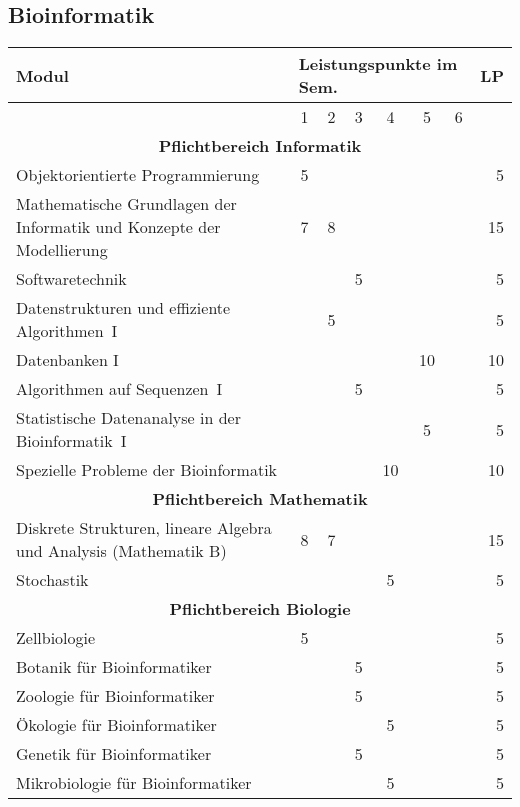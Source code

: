 \subsection{Bioinformatik}
\label{studiengang_bioinformatik}

\begin{table}[tbp]
\begin{small}
\begin{tabularx}{\textwidth}{|X||c|c|c|c|c|c||r|}
    \hline
    \textbf{Modul}&\multicolumn{6}{l||}{\textbf{Leistungspunkte im Sem.}}&\textbf{LP}\\\hline
    &1&2&3&4&5&6&\\\hline\hline
    \multicolumn{8}{|c|}{\textbf{Pflichtbereich Informatik}}\\\hline
    Objektorientierte Programmierung&5&&&&&&5\\\hline
    Mathematische Grundlagen der Informatik und Konzepte der Modellierung&7&8&&&&&15\\\hline
    Softwaretechnik&&&5&&&&5\\\hline
    Datenstrukturen und effiziente Algorithmen~I&&5&&&&&5\\\hline
    Datenbanken I&&&&&10&&10\\\hline
    Algorithmen auf Sequenzen~I&&&5&&&&5\\\hline
    Statistische Datenanalyse in der Bioinformatik~I&&&&&5&&5\\\hline
    Spezielle Probleme der Bioinformatik &&&&10&&&10\\\hline\hline
    \multicolumn{8}{|c|}{\textbf{Pflichtbereich Mathematik}}\\\hline
    Diskrete Strukturen, lineare Algebra und Analysis (Mathematik B)&8&7&&&&&15\\\hline
    Stochastik&&&&5&&&5\\\hline\hline
    \multicolumn{8}{|c|}{\textbf{Pflichtbereich Biologie}}\\\hline
    Zellbiologie&5&&&&&&5\\\hline
    Botanik für Bioinformatiker&&&5&&&&5\\\hline
    Zoologie für Bioinformatiker&&&5&&&&5\\\hline
    Ökologie für Bioinformatiker&&&&5&&&5\\\hline
    Genetik für Bioinformatiker&&&5&&&&5\\\hline
    Mikrobiologie für Bioinformatiker&&&&5&&&5\\\hline\hline

\end{tabularx}
\end{small}
\end{table}
